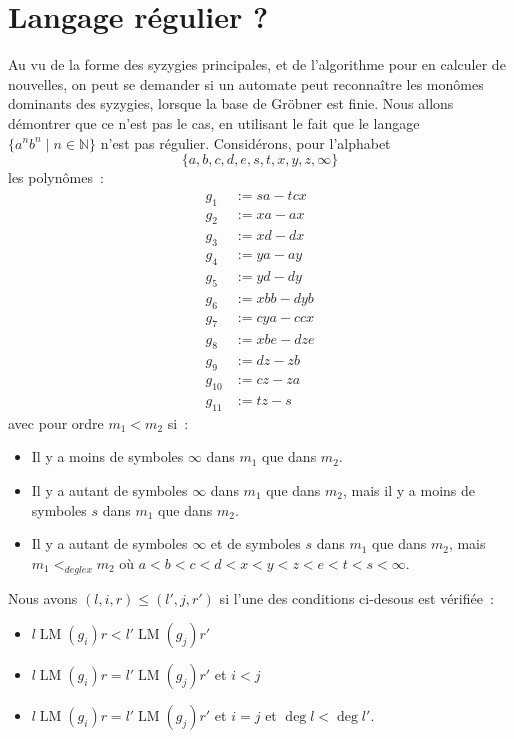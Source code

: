 \documentclass{article}
\newcommand{\N}{\mathbb{N}}
\DeclareMathOperator{\LM}{LM}
\begin{document}
\section*{Langage régulier ?}
Au vu de la forme des syzygies principales, et de l'algorithme pour en calculer de nouvelles, on peut se demander si un automate peut reconnaître les monômes dominants des syzygies, lorsque la base de Gröbner est finie.
Nous allons démontrer que ce n'est pas le cas, en utilisant le fait que le langage $\{a^nb^n \;|\; n \in \N\}$ n'est pas régulier.
Considérons, pour l'alphabet 
$$\{a, b, c, d, e, s, t, x, y, z, \infty\}$$
les polynômes~:
\begin{align*}
g_1 & := sa - tcx \\
g_2 & := xa - ax \\
g_3 & := xd - dx \\
g_4 & := ya - ay \\
g_5 & := yd - dy \\
g_6 & := xbb - dyb \\
g_7 & := cya - ccx \\
g_8 & := xbe - dze \\
g_9 & := dz - zb \\
g_{10} & := cz - za \\
g_{11} & := tz - s
\end{align*}
avec pour ordre $m_1 < m_2$ si~:
\begin{itemize}
\item Il y a moins de symboles $\infty$ dans $m_1$ que dans $m_2$.
\item Il y a autant de symboles $\infty$ dans $m_1$ que dans $m_2$, mais il y a moins de symboles $s$ dans $m_1$ que dans $m_2$.
\item Il y a autant de symboles $\infty$ et de symboles $s$ dans $m_1$ que dans $m_2$, mais
$m_1 <_{deglex} m_2$ où $a < b < c < d < x < y < z < e < t < s < \infty$.
\end{itemize}

Nous avons $(l, i, r) \leq (l', j, r')$ si l'une des conditions ci-desous est vérifiée~:
\begin{itemize}
	\item $l\LM(g_i)r < l'\LM(g_j)r'$
	\item $l\LM(g_i)r = l'\LM(g_j)r'$ et $i < j$
	\item $l\LM(g_i)r = l'\LM(g_j)r'$ et $i = j$ et $\deg{l} < \deg{l'}$.
\end{itemize}
\end{document}
